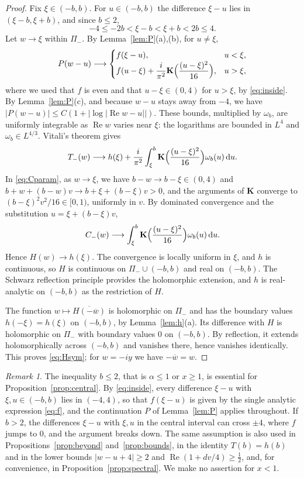 \documentclass[11pt]{amsart}
\numberwithin{equation}{section}
\theoremstyle{definition}
\theoremstyle{remark}
\newtheorem{remark}[theorem]{Remark}
\newcommand{\Pim}{\Pi_{-}}
\newcommand{\dd}{\,\mathrm{d}}
\DeclareMathOperator{\re}{Re}
\newcommand{\Kc}{\mathbf{K}}
\begin{document}
\begin{proof}
Fix $\xi\in(-b,b)$. For $u\in(-b,b)$ the difference $\xi-u$ lies in
$(\xi-b,\xi+b)$, and since $b\le2$,
\begin{equation}\label{eq:inside}
-4\le-2b<\xi-b<\xi+b<2b\le4 .
\end{equation}
Let $w\to \xi$ within $\Pim$. By Lemma~\ref{lem:P}(a),(b), for $u\ne \xi$,
\[
P(w-u)\longrightarrow
\begin{cases}
f(\xi-u), & u<\xi,\\
f(u-\xi)+\dfrac{i}{\pi^2}\Kc\Bigl(\dfrac{(u-\xi)^2}{16}\Bigr), & u>\xi,
\end{cases}
\]
where we used that $f$ is even and that $u-\xi\in(0,4)$ for $u>\xi$, by
\eqref{eq:inside}. By Lemma~\ref{lem:P}(c), and because $w-u$ stays away from
$-4$, we have $|P(w-u)|\le C(1+|\log|\re w-u||)$. These bounds, multiplied by
$\omega_b$, are uniformly integrable as $\re w$ varies near $\xi$: the
logarithms are bounded in $L^4$ and $\omega_b\in L^{4/3}$. Vitali's theorem
gives
\[
T_-(w)\longrightarrow h(\xi)+\frac{i}{\pi^2}\int_\xi ^b\Kc\Bigl(\frac{(u-\xi)^2}{16}\Bigr)\omega_b(u)\dd u .
\]
In \eqref{eq:Cparam}, as $w\to \xi$, we have $b-w\to b-\xi\in(0,4)$ and
$b+w+(b-w)v\to b+\xi+(b-\xi)v>0$, and the arguments of $\Kc$ converge to
$(b-\xi)^2v^2/16\in[0,1)$, uniformly in $v$. By dominated convergence and the
substitution $u=\xi+(b-\xi)v$,
\[
C_-(w)\longrightarrow\int_\xi ^b\Kc\Bigl(\frac{(u-\xi)^2}{16}\Bigr)\omega_b(u)\dd u .
\]
Hence $H(w)\to h(\xi)$. The convergence is locally uniform in $\xi$, and $h$ is
continuous, so $H$ is continuous on $\Pim\cup(-b,b)$ and real on $(-b,b)$.
The Schwarz reflection principle provides the holomorphic extension, and $h$
is real-analytic on $(-b,b)$ as the restriction of $H$.

The function $w\mapsto\overline{H(-\overline w)}$ is holomorphic on $\Pim$
and has the boundary values $h(-\xi)=h(\xi)$ on $(-b,b)$, by
Lemma~\ref{lem:h}(a). Its difference with $H$ is holomorphic on $\Pim$ with
boundary values $0$ on $(-b,b)$. By reflection, it extends holomorphically
across $(-b,b)$ and vanishes there, hence vanishes identically. This proves
\eqref{eq:Hsym}; for $w=-iy$ we have $-\overline w=w$.
\end{proof}

\begin{remark}\label{rem:xge1}
The inequality $b\le2$, that is $\alpha\le1$ or $x\ge1$, is essential for
Proposition~\ref{prop:central}. By \eqref{eq:inside}, every difference
$\xi-u$ with $\xi,u\in(-b,b)$ lies in $(-4,4)$, so that $f(\xi-u)$ is given
by the single analytic expression \eqref{eq:f}, and the
continuation $P$ of Lemma~\ref{lem:P} applies throughout. If $b>2$, the
differences $\xi-u$ with $\xi,u$ in the central interval can cross $\pm4$,
where $f$ jumps to $0$, and the argument breaks down. The same assumption is
also used in Propositions~\ref{prop:beyond} and~\ref{prop:bounds}, in the
identity $T(b)=h(b)$ and in the lower bounds $|w-u+4|\ge2$ and
$\re(1+dv/4)\ge\frac12$, and, for convenience, in
Proposition~\ref{prop:spectral}. We make no assertion for $x<1$.
\end{remark}
\end{document}
